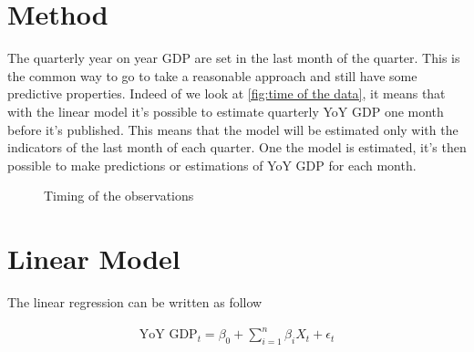 \documentclass[12pt,a4paper,oneside]{book}
\newcommand{\ImageWidth}{11cm}
\begin{document}
\section{Method}

The quarterly year on year GDP are set in the last month of the quarter. This is the common way to go to take a reasonable approach and still have some predictive properties.
Indeed of we look at \autoref{fig:time of the data}, it means that with the linear model it's possible to estimate quarterly YoY GDP one month before it's published. 
This means that the model will be estimated only with the indicators of the last month of each quarter. One the model is estimated, it's then possible to make predictions or estimations of YoY GDP for each month.


\begin{figure}[H]
     \centering \footnotesize
{}
    \caption{Timing of the observations}
    \label{fig:time of the data}
\end{figure}


\section{Linear Model}

The linear regression can be written as follow

\begin{eqnarray}
    \text{YoY GDP}_{t} = \beta_0 + \sum^n_{i = 1}
       \beta_{i} X_{t} + \epsilon_t 
\end{eqnarray}
\end{document}
